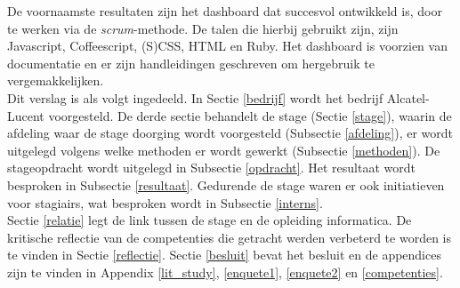 \documentclass[10pt,a4paper]{article}
\begin{document}
De voornaamste resultaten zijn het dashboard dat succesvol ontwikkeld is, door te werken via de \textit{scrum}-methode. De talen die hierbij gebruikt zijn, zijn Javascript, Coffeescript, (S)CSS, HTML en Ruby. Het dashboard is voorzien van documentatie en er zijn handleidingen geschreven om hergebruik te vergemakkelijken.\\

Dit verslag is als volgt ingedeeld. In Sectie \ref{bedrijf} wordt het bedrijf Alcatel-Lucent voorgesteld. De derde sectie behandelt de stage (Sectie \ref{stage}), waarin de afdeling waar de stage doorging wordt voorgesteld (Subsectie \ref{afdeling}), er wordt uitgelegd volgens welke methoden er wordt gewerkt (Subsectie \ref{methoden}). De stageopdracht wordt uitgelegd in Subsectie \ref{opdracht}. Het resultaat wordt besproken in Subsectie \ref{resultaat}. Gedurende de stage waren er ook initiatieven voor stagiairs, wat besproken wordt in Subsectie \ref{interns}.\\
Sectie \ref{relatie} legt de link tussen de stage en de opleiding informatica. De kritische reflectie van de competenties die getracht werden verbeterd te worden is te vinden in Sectie \ref{reflectie}. Sectie \ref{besluit} bevat het besluit en de appendices zijn te vinden in Appendix \ref{lit_study}, \ref{enquete1}, \ref{enquete2} en \ref{competenties}. 
\end{document}
